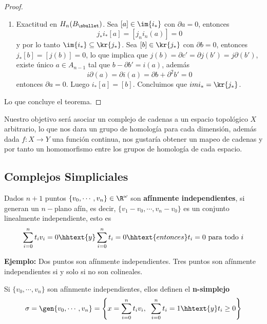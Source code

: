 \documentclass{article}
\begin{document}
\begin{proof}
\begin{enumerate}
        \item Exactitud en $H_{n}(B_{\sbullet})$. Sea $[a]\in\im{i_{*}}$ con $\partial a=0$, 
        entonces
        \begin{equation*}
            j_{*}i_{*}[a]=[j_{n}i_{n}(a)]=0
        \end{equation*}
        y por lo tanto $\im{i_{*}}\subseteq\kr{j_{*}}$. Sea $[b]\in\kr{j_{*}}$ con 
        $\partial b=0$, entonces $j_{*}[b]=[j(b)]=0$, lo que implica que $j(b)=\partial c'
        =\partial j(b')=j\partial(b')$, existe único $a\in A_{n-1}$ tal que $b-\partial b'=i(a)$,
        además
        \begin{equation*}
            i\partial(a)=\partial i(a)=\partial b+\partial^{2}b'=0
        \end{equation*}
        entonces $\partial a=0$. Luego $i_{*}[a]=[b]$. Concluimos que $im{i_{*}}=\kr{j_{*}}$.
    \end{enumerate}
    Lo que concluye el teorema.
\end{proof}

\vspace{2mm}
\noindent Nuestro objetivo será asociar un complejo de cadenas a un espacio topológico $X$ 
arbitrario, lo que nos dara un grupo de homología para cada dimensión, además dada $f:X\to Y$ una
función continua, nos gustaría obtener un mapeo de cadenas y por tanto un homomorfismo entre los
grupos de homología de cada espacio.

\newpage
\subsection{Complejos Simpliciales}
\begin{dfn}
    Dados $n+1$ puntos $\{v_{0},\cdots,v_{n}\}\in\R^{\omega}$ son \textbf{afínmente 
    independientes}, si generan un $n-$plano afín, es decir, $\{v_{1}-v_{0},\cdots,v_{n}-v_{0}\}$
    es un conjunto linealmente independiente, esto es
    \begin{equation*}
        \sum_{i=0}^{n}t_{i}v_{i}=0\hhtext{y}\sum_{i=0}^{n}t_{i}=0
        \hhtext{entonces}t_{i}=0\text{ para todo }i
    \end{equation*}
\end{dfn}

\vspace{2mm}
\noindent\textbf{Ejemplo:} Dos puntos son afínmente independientes. Tres puntos son afínmente 
independientes si y solo si no son colineales.

\vspace{2mm}
\begin{dfn}
    Si $\{v_{0},\cdots,v_{n}\}$ son afínmente independientes, ellos definen el \textbf{n-simplejo}
    \begin{equation*}
        \sigma=\gen{v_{0},\cdots,v_{n}}=\left\{x=\sum_{i=0}^{n}t_{i}v_{i},\hspace{2mm}
        \sum_{i=0}^{n}t_{i}=1\hhtext{y}t_{i}\geq0\right\}
    \end{equation*}
\end{dfn}
\end{document}

